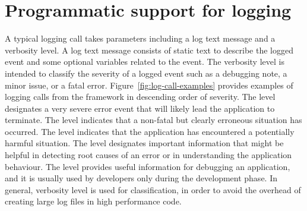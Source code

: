 





\section{Programmatic support for logging} \label{background Logging}
A typical logging call takes parameters including a log text message and a verbosity level. A log text message consists of static text to describe the logged event and some optional variables related to the event. The verbosity level is intended to classify the severity of a logged event such as a debugging note, a minor issue, or a fatal error. Figure~\ref{fig:log-call-examples} provides examples of logging calls from the  framework in descending order of severity. The  level designates a very severe error event that will likely lead the application to terminate. The  level indicates that a non-fatal but clearly erroneous situation has occurred. The  level indicates that the application has encountered a potentially harmful situation. The  level designates important information that might be helpful in detecting root causes of an error or in understanding the application behaviour. The  level provides useful information for debugging an application, and it is usually used by developers only during the development phase. In general, verbosity level is used for classification, in order to avoid the overhead of creating large log files in high performance code.


